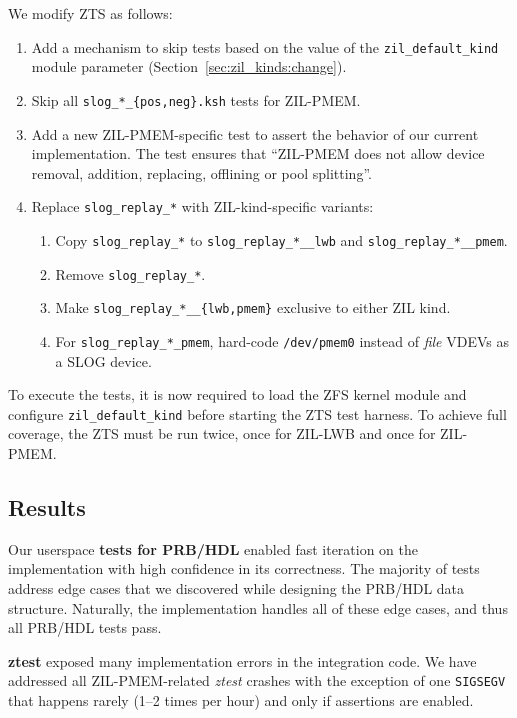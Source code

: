 \documentclass[12pt,a4paper,twoside]{book}
\begin{document}
{We modify ZTS as follows:
\begin{enumerate}[noitemsep]
    \item Add a mechanism to skip tests based on the value of the \lstinline{zil_default_kind} module parameter (Section~\ref{sec:zil_kinds:change}).
    \item Skip all \lstinline|slog_*_{pos,neg}.ksh| tests for ZIL-PMEM.
    \item Add a new ZIL-PMEM-specific test to assert the behavior of our current implementation.
        The test ensures that ``ZIL-PMEM does not allow device removal, addition, replacing, offlining or pool splitting''.
    \item Replace \lstinline{slog_replay_*} with ZIL-kind-specific variants:
        \begin{enumerate}
            \item Copy \lstinline{slog_replay_*} to \lstinline{slog_replay_*__lwb} and \lstinline{slog_replay_*__pmem}.
            \item Remove \lstinline{slog_replay_*}.
            \item Make \lstinline|slog_replay_*__{lwb,pmem}| exclusive to either ZIL kind.
            \item For \lstinline{slog_replay_*_pmem}, hard-code \lstinline{/dev/pmem0} instead of \textit{file} VDEVs as a SLOG device.
        \end{enumerate}
\end{enumerate}
To execute the tests, it is now required to load the ZFS kernel module and configure \lstinline{zil_default_kind} before starting the ZTS test harness.
To achieve full coverage, the ZTS must be run twice, once for ZIL-LWB and once for ZIL-PMEM.

\subsection{Results}\label{sec:eval:correctness:results}

Our userspace \textbf{tests for PRB/HDL} enabled fast iteration on the implementation with high confidence in its correctness.
The majority of tests address edge cases that we discovered while designing the PRB/HDL data structure.
Naturally, the implementation handles all of these edge cases, and thus all PRB/HDL tests pass.

\textbf{ztest} exposed many implementation errors in the integration code.
We have addressed all ZIL-PMEM-related \textit{ztest} crashes with the exception of one \lstinline{SIGSEGV} that happens rarely (1--2 times per hour) and only if assertions are enabled.

}
\end{document}

